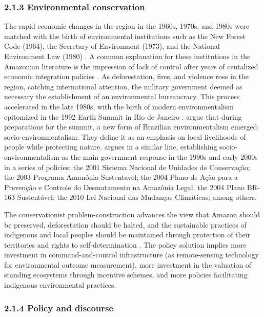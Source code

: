 \documentclass[]{interact}
\theoremstyle{plain}%
\theoremstyle{definition}
\theoremstyle{remark}
\begin{document}
\hypertarget{environmental-conservation}{%
\subsubsection{2.1.3 Environmental
conservation}\label{environmental-conservation}}

The rapid economic changes in the region in the 1960s, 1970s, and 1980s
were matched with the birth of environmental institutions such as the
New Forest Code (1964), the Secretary of Environment (1973), and the
National Environment Law (1980) \citep{drummond2006}. A common
explanation for these institutions in the Amazonian literature is the
impression of lack of control after years of centalized economic
integration policies \citep{acker2021, capobianco2021, hecht1990}. As
deforestation, fires, and violence rose in the region, catching
international attention, the military government deemed as necessary the
establishment of an environmental bureaucracy. This process accelerated
in the late 1980s, with the birth of modern environmentalism epitomized
in the 1992 Earth Summit in Rio de Janeiro
\citep{hochstetler2021, capobianco2021}. \citet{hochstetler2007} argue
that during preparations for the summit, a new form of Brazilian
environmentalism emerged: socio-environmentalism. They define it as an
emphasis on local livelihoods of people while protecting nature.
\citet{capobianco2019} argues in a similar line, establishing
socio-environmentalism as the main government response in the 1990s and
early 2000s in a series of policies: the 2001 Sistema Nacional de
Unidades de Conservação; the 2003 Programa Amanônia Sustentavel; the
2004 Plano de Ação para a Prevenção e Controle do Desmatamento na
Amazônia Legal; the 2004 Plano BR-163 Sustentável; the 2010 Lei Nacional
das Mudanças Climáticas; among others.

The conservationist problem-construction advances the view that Amazon
should be preserved, deforestation should be halted, and the sustainable
practices of indigenous and local peoples should be maintained through
protection of their territories and rights to self-determination
\citep{hochstetler2007}. The policy solution implies more investment in
command-and-control infrastructure (as remote-sensing technology for
environmental outcome measurement), more investment in the valuation of
standing ecosystems through incentive schemes, and more policies
facilitating indigenous environmental practices.

\hypertarget{policy-and-discourse}{%
\subsubsection{2.1.4 Policy and discourse}\label{policy-and-discourse}}
\end{document}
